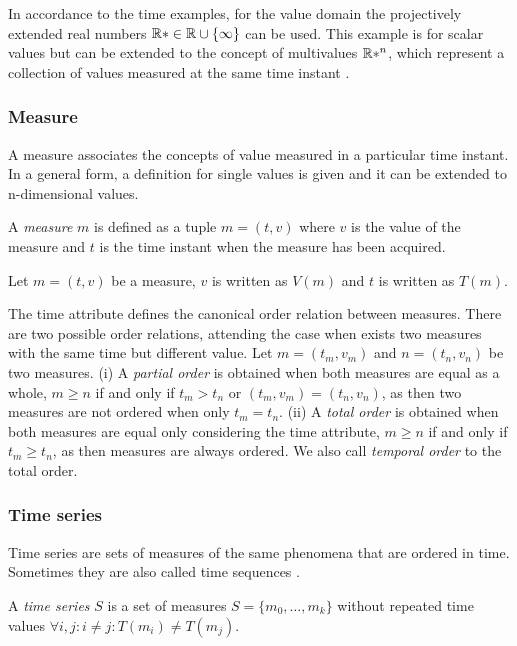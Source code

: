 In accordance to the time examples, for the value domain the
projectively extended real numbers $\mathbb{R}* \in \mathbb{R} \cup \{\infty\}$ can be
used.  This example is for scalar values but can be extended to the
concept of multivalues $\mathbb{R}*^n$, which represent a collection of values
measured at the same time instant \cite{assfalg08:thesis}.




\subsubsection{Measure}

A measure associates the concepts of value measured in a particular
time instant.  In a general form, a definition for single values is
given and it can be extended to n-dimensional values.

\begin{definition}
  A \emph{measure} $m$ is defined as a tuple $m=(t,v)$ where $v$ is the
  value of the measure and $t$ is the time instant when the measure
  has been acquired.
\end{definition}

Let $m = (t,v)$ be a measure, $v$ is written as $V(m)$ and $t$ is
written as $T(m)$.


The time attribute defines the canonical order relation between
measures. There are two possible order relations, attending the case
when exists two measures with the same time but different value. Let
$m = (t_m, v_m)$ and $n = (t_n, v_n)$ be two measures.  (i) A
\emph{partial order} is obtained when both measures are equal as a
whole, $m \geq n$ if and only if $t_m > t_n$ or $(t_m, v_m) = (t_n,
v_n)$, as then two measures are not ordered when only $t_m =
t_n$. (ii) A \emph{total order} is obtained when both measures are
equal only considering the time attribute, $m\geq n$ if and only if
$t_m\geq t_n$, as then measures are always ordered.  We also call
\emph{temporal order} to the total order.



\subsubsection{Time series}

Time series are sets of measures of the same phenomena that are
ordered in time.  Sometimes they are also called time sequences
\cite{last:hetland}.


\begin{definition}
  A \emph{time series} $S$ is a set of measures $S = \{m_0, \ldots,
  m_k\}$ without repeated time values $\forall i,j:i\neq j: T(m_i)\neq
  T(m_j)$.
\end{definition}

